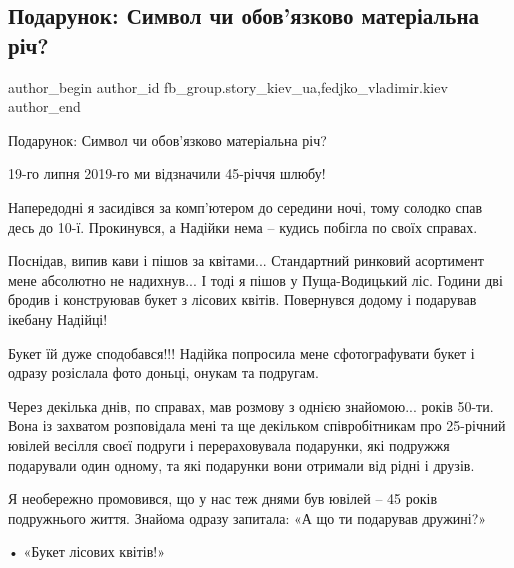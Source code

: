  
 
 
 
 
 
\subsection{Подарунок: Символ чи обов’язково матеріальна річ?}
\label{sec:07_12_2021.fb.fb_group.story_kiev_ua.1.podarok}
 
\ifcmt
 author_begin
   author_id fb_group.story_kiev_ua,fedjko_vladimir.kiev
 author_end
\fi

Подарунок: Символ чи обов’язково матеріальна річ? 

19-го липня 2019-го ми відзначили 45-річчя шлюбу! 

Напередодні я засидівся за комп’ютером до середини ночі, тому солодко спав десь
до 10-ї. Прокинувся, а Надійки нема – кудись побігла по своїх справах. 

Поснідав, випив кави і пішов за квітами... Стандартний ринковий асортимент мене
абсолютно не надихнув... І тоді я пішов у Пуща-Водицький ліс. Години дві бродив і
конструював букет з лісових квітів. Повернувся додому і подарував ікебану
Надійці!


Букет їй дуже сподобався!!! Надійка попросила мене сфотографувати букет і
одразу розіслала фото доньці, онукам та подругам. 

Через декілька днів, по справах, мав розмову з однією знайомою... років 50-ти.
Вона із захватом розповідала мені та ще декільком співробітникам про 25-річний
ювілей весілля своєї подруги і перераховувала подарунки, які подружжя
подарували один одному, та які подарунки вони отримали від рідні і друзів. 

Я необережно промовився, що у нас теж днями був ювілей – 45 років подружнього
життя. Знайома одразу запитала: «А що ти подарував дружині?»

• «Букет лісових квітів!»

